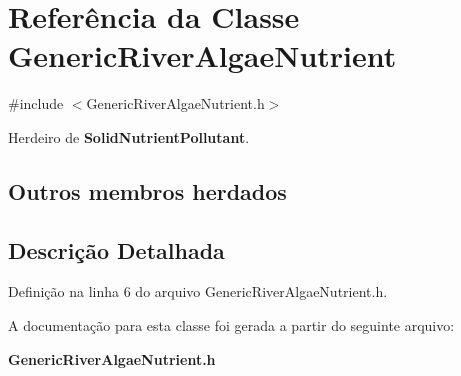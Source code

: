 \section{Referência da Classe Generic\+River\+Algae\+Nutrient}
\label{class_generic_river_algae_nutrient}


{\ttfamily \#include $<$Generic\+River\+Algae\+Nutrient.\+h$>$}



Herdeiro de {\bf Solid\+Nutrient\+Pollutant}.

\subsection*{Outros membros herdados}


\subsection{Descrição Detalhada}


Definição na linha 6 do arquivo Generic\+River\+Algae\+Nutrient.\+h.



A documentação para esta classe foi gerada a partir do seguinte arquivo\+:\begin{DoxyCompactItemize}
\item 
{\bf Generic\+River\+Algae\+Nutrient.\+h}\end{DoxyCompactItemize}
